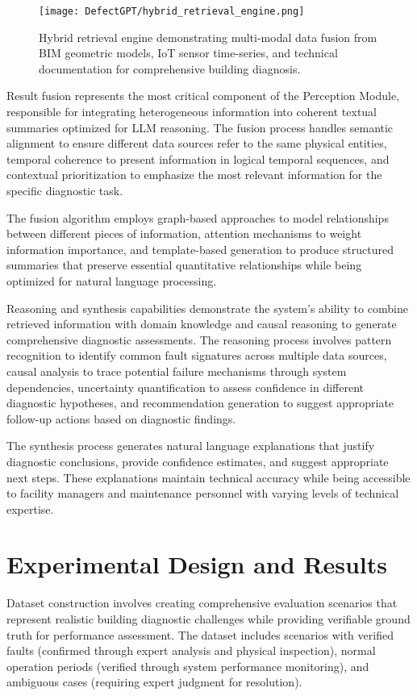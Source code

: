 \begin{figure}[htbp]
\centering
\texttt{[image: DefectGPT/hybrid\_retrieval\_engine.png]}
\caption{Hybrid retrieval engine demonstrating multi-modal data fusion from BIM geometric models, IoT sensor time-series, and technical documentation for comprehensive building diagnosis.}
\label{fig:hybrid_retrieval_engine}
\end{figure}

Result fusion represents the most critical component of the Perception Module, responsible for integrating heterogeneous information into coherent textual summaries optimized for LLM reasoning. The fusion process handles semantic alignment to ensure different data sources refer to the same physical entities, temporal coherence to present information in logical temporal sequences, and contextual prioritization to emphasize the most relevant information for the specific diagnostic task.

The fusion algorithm employs graph-based approaches to model relationships between different pieces of information, attention mechanisms to weight information importance, and template-based generation to produce structured summaries that preserve essential quantitative relationships while being optimized for natural language processing.

Reasoning and synthesis capabilities demonstrate the system's ability to combine retrieved information with domain knowledge and causal reasoning to generate comprehensive diagnostic assessments. The reasoning process involves pattern recognition to identify common fault signatures across multiple data sources, causal analysis to trace potential failure mechanisms through system dependencies, uncertainty quantification to assess confidence in different diagnostic hypotheses, and recommendation generation to suggest appropriate follow-up actions based on diagnostic findings.

The synthesis process generates natural language explanations that justify diagnostic conclusions, provide confidence estimates, and suggest appropriate next steps. These explanations maintain technical accuracy while being accessible to facility managers and maintenance personnel with varying levels of technical expertise.

\section{Experimental Design and Results}

Dataset construction involves creating comprehensive evaluation scenarios that represent realistic building diagnostic challenges while providing verifiable ground truth for performance assessment. The dataset includes scenarios with verified faults (confirmed through expert analysis and physical inspection), normal operation periods (verified through system performance monitoring), and ambiguous cases (requiring expert judgment for resolution).


